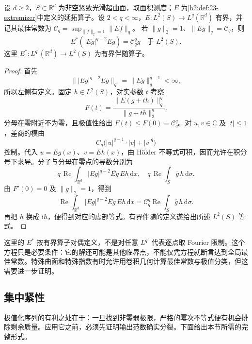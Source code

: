 \begin{proposition}\label{b2:prop:23-extremizer-euler}
设 \(d\geq2\)，\(S\subset\mathbb R^d\) 为非空紧致光滑超曲面，取面积测度；\(E\) 为\cref{b2:def:23-extremizer}中定义的延拓算子。设 \(2<q<\infty\)，\(E:L^2(S)\to L^q(\mathbb R^d)\) 有界，并记其最佳常数为
\(\mathcal C_q=\sup_{\|f\|_2=1}\|Ef\|_q\)。
若 \(\|g\|_2=1\)、\(\|Eg\|_q=\mathcal C_q\)，则
\[
 E^*(|Eg|^{q-2}Eg)=\mathcal C_q^q g
 \quad\text{于 }L^2(S).
\]
这里 \(E^*:L^{q'}(\mathbb R^d)\to L^2(S)\) 为有界伴随算子。
\end{proposition}
\begin{proof}
首先
\[
 \bigl\||Eg|^{q-2}Eg\bigr\|_{q'}
 =\|Eg\|_q^{q-1}<\infty,
\]
所以左侧有定义。固定 \(h\in L^2(S)\)，对实参数 \(t\) 考察
\[
 F(t)=\frac{\|E(g+th)\|_q^q}{\|g+th\|_2^q}.
\]
分母在零附近不为零，且极值性给出 \(F(t)\leq F(0)=\mathcal C_q^q\)。对 \(u,v\in\mathbb C\) 及 \(|t|\leq1\)，差商的模由
\[
 C_q\bigl(|u|^{q-1}\cdot|v|+|v|^q\bigr)
\]
控制。代入 \(u=Eg(x)\)、\(v=Eh(x)\)，由 Hölder 不等式可积，因而允许在积分号下求导。分子与分母在零点的导数分别为
\[
 q\,\operatorname{Re}\int_{\mathbb R^d}
       |Eg|^{q-2}\overline{Eg}\,Eh\,\mathrm dx,\quad
 q\,\operatorname{Re}\int_S\overline g\,h\,\mathrm d\sigma.
\]
由 \(F'(0)=0\) 及 \(\|g\|_2=1\)，得到
\[
 \operatorname{Re}\int_{\mathbb R^d}
       |Eg|^{q-2}\overline{Eg}\,Eh\,\mathrm dx
 =\mathcal C_q^q\operatorname{Re}
       \int_S\overline g\,h\,\mathrm d\sigma.
\]
再把 \(h\) 换成 \(\mathrm i h\)，便得到对应的虚部等式。有界伴随的定义遂给出所述 \(L^2(S)\) 等式。
\end{proof}

这里的 \(E^*\) 按有界算子对偶定义，不是对任意 \(L^{q'}\) 代表逐点取 Fourier 限制。这个方程只是必要条件：它的解还可能是其他临界点，不能仅凭方程就断言达到全局最佳常数。特殊曲面和特殊指数有时允许用卷积几何计算最佳常数与极值分类，但这需要进一步证明。

\subsection{集中紧性}
\label{b2:subsec:230505}

极值化序列的有利之处在于：一旦找到非零弱极限，严格的幂次不等式便有机会排除剩余质量。应用它之前，必须先证明输出范数确实分裂。下面给出本节所需的完整形式。

